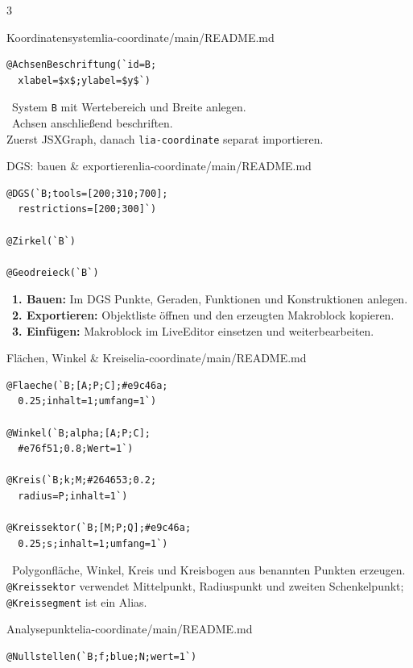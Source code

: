 \documentclass[a4paper,landscape,9pt]{extarticle}
\newcommand{\prevsm}[1]{{\footnotesize\color{muted} #1}}
\begin{document}
\begin{multicols}{3}
\begin{schulcard}{Koordinatensystem}{lia-coordinate/main/README.md}
\begin{lstlisting}[language=lia]
@AchsenBeschriftung(`id=B;
  xlabel=$x$;ylabel=$y$`)
\end{lstlisting}
\tcblower
\prevsm{\faBorderAll~System \texttt{B} mit Wertebereich und Breite anlegen.\\[2pt]
\faProjectDiagram~Achsen anschließend beschriften.\\[2pt]
{\footnotesize Zuerst JSXGraph, danach \texttt{lia-coordinate} separat importieren.}}
\end{schulcard}

\begin{schulcard}{DGS: bauen \& exportieren}{lia-coordinate/main/README.md}
\begin{lstlisting}[language=lia]
@DGS(`B;tools=[200;310;700];
  restrictions=[200;300]`)

@Zirkel(`B`)

@Geodreieck(`B`)
\end{lstlisting}
\tcblower
\prevsm{\faDraftingCompass~\textbf{1. Bauen:} Im DGS Punkte, Geraden, Funktionen und Konstruktionen anlegen.\\[2pt]
\faDownload~\textbf{2. Exportieren:} Objektliste öffnen und den erzeugten Makroblock kopieren.\\[2pt]
\faEdit~\textbf{3. Einfügen:} Makroblock im LiveEditor einsetzen und weiterbearbeiten.}
\end{schulcard}

\begin{schulcard}{Flächen, Winkel \& Kreise}{lia-coordinate/main/README.md}
\begin{lstlisting}[language=lia]
@Flaeche(`B;[A;P;C];#e9c46a;
  0.25;inhalt=1;umfang=1`)

@Winkel(`B;alpha;[A;P;C];
  #e76f51;0.8;Wert=1`)

@Kreis(`B;k;M;#264653;0.2;
  radius=P;inhalt=1`)

@Kreissektor(`B;[M;P;Q];#e9c46a;
  0.25;s;inhalt=1;umfang=1`)
\end{lstlisting}
\tcblower
\prevsm{\faShapes~Polygonfläche, Winkel, Kreis und Kreisbogen aus benannten Punkten erzeugen.\\[2pt]
\texttt{@Kreissektor} verwendet Mittelpunkt, Radiuspunkt und zweiten Schenkelpunkt; \texttt{@Kreissegment} ist ein Alias.}
\end{schulcard}

\begin{schulcard}{Analysepunkte}{lia-coordinate/main/README.md}
\begin{lstlisting}[language=lia]
@Nullstellen(`B;f;blue;N;wert=1`)


\end{lstlisting}
\end{schulcard}
\end{multicols}
\end{document}
